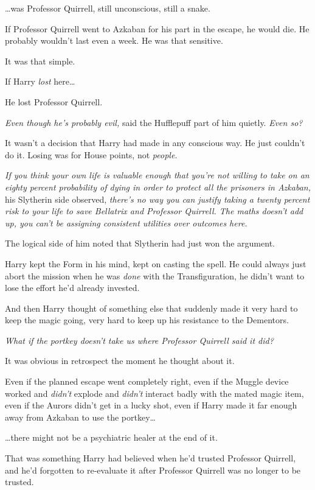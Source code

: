 …was Professor Quirrell, still unconscious, still a snake.

If Professor Quirrell went to Azkaban for his part in the escape, he would die. He probably wouldn’t last even a week. He was that sensitive.

It was that simple.

If Harry \emph{lost} here…

He lost Professor Quirrell.

\emph{Even though he’s probably evil,} said the Hufflepuff part of him quietly. \emph{Even so?}

It wasn’t a decision that Harry had made in any conscious way. He just couldn’t do it. Losing was for House points, not \emph{people.}

\emph{If you think your own life is valuable enough that you’re not willing to take on an eighty percent probability of dying in order to protect all the prisoners in Azkaban,} his Slytherin side observed, \emph{there’s no way you can justify taking a twenty percent risk to your life to save Bellatrix and Professor Quirrell. The maths doesn’t add up, you can’t be assigning consistent utilities over outcomes here.}

The logical side of him noted that Slytherin had just won the argument.

Harry kept the Form in his mind, kept on casting the spell. He could always just abort the mission when he was \emph{done} with the Transfiguration, he didn’t want to lose the effort he’d already invested.

And then Harry thought of something else that suddenly made it very hard to keep the magic going, very hard to keep up his resistance to the Dementors.

\emph{What if the portkey doesn’t take us where Professor Quirrell said it did?}

It was obvious in retrospect the moment he thought about it.

Even if the planned escape went completely right, even if the Muggle device worked and \emph{didn’t} explode and \emph{didn’t} interact badly with the mated magic item, even if the Aurors didn’t get in a lucky shot, even if Harry made it far enough away from Azkaban to use the portkey…

…there might not be a psychiatric healer at the end of it.

That was something Harry had believed when he’d trusted Professor Quirrell, and he’d forgotten to re-evaluate it after Professor Quirrell was no longer to be trusted.


